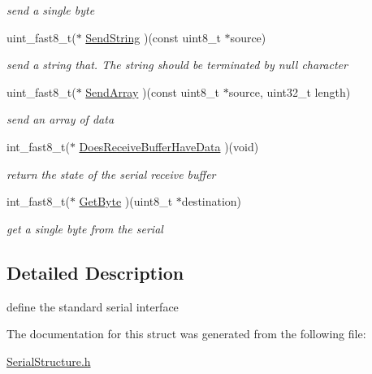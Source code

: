 \begin{DoxyCompactItemize}
\begin{DoxyCompactList}\small\item\em send a single byte \end{DoxyCompactList}\item 
\hypertarget{struct_serial_interface_a2dc11441227e78ac5a281f88f8fab577}{uint\-\_\-fast8\-\_\-t($\ast$ \hyperlink{struct_serial_interface_a2dc11441227e78ac5a281f88f8fab577}{Send\-String} )(const uint8\-\_\-t $\ast$source)}\label{struct_serial_interface_a2dc11441227e78ac5a281f88f8fab577}

\begin{DoxyCompactList}\small\item\em send a string that. The string should be terminated by null character \end{DoxyCompactList}\item 
\hypertarget{struct_serial_interface_a2f49f38e4a372077a2755eb5e7884b35}{uint\-\_\-fast8\-\_\-t($\ast$ \hyperlink{struct_serial_interface_a2f49f38e4a372077a2755eb5e7884b35}{Send\-Array} )(const uint8\-\_\-t $\ast$source, uint32\-\_\-t length)}\label{struct_serial_interface_a2f49f38e4a372077a2755eb5e7884b35}

\begin{DoxyCompactList}\small\item\em send an array of data \end{DoxyCompactList}\item 
\hypertarget{struct_serial_interface_a3c8c5895d4ebeaa8d1bf911c7f5e9dbd}{int\-\_\-fast8\-\_\-t($\ast$ \hyperlink{struct_serial_interface_a3c8c5895d4ebeaa8d1bf911c7f5e9dbd}{Does\-Receive\-Buffer\-Have\-Data} )(void)}\label{struct_serial_interface_a3c8c5895d4ebeaa8d1bf911c7f5e9dbd}

\begin{DoxyCompactList}\small\item\em return the state of the serial receive buffer \end{DoxyCompactList}\item 
\hypertarget{struct_serial_interface_a318df81760d2f0b0fb209fc39594b45e}{int\-\_\-fast8\-\_\-t($\ast$ \hyperlink{struct_serial_interface_a318df81760d2f0b0fb209fc39594b45e}{Get\-Byte} )(uint8\-\_\-t $\ast$destination)}\label{struct_serial_interface_a318df81760d2f0b0fb209fc39594b45e}

\begin{DoxyCompactList}\small\item\em get a single byte from the serial \end{DoxyCompactList}\end{DoxyCompactItemize}


\subsection{Detailed Description}
define the standard serial interface 

The documentation for this struct was generated from the following file\-:\begin{DoxyCompactItemize}
\item 
\hyperlink{_serial_structure_8h}{Serial\-Structure.\-h}\end{DoxyCompactItemize}

